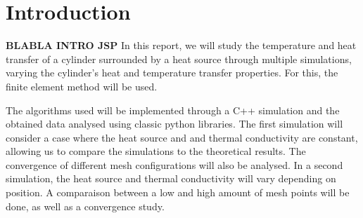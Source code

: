 \section{Introduction}

\textbf{BLABLA INTRO JSP}
In this report, we will study the temperature and heat transfer of a cylinder surrounded by a heat source through multiple simulations, varying the cylinder's heat and temperature transfer properties. For this, the finite element method will be used.

The algorithms used will be implemented through a C++ simulation and the obtained data analysed using classic python libraries. The first simulation will consider a case where the heat source and and thermal conductivity are constant, allowing us to compare the simulations to the theoretical results. The convergence of different mesh configurations will also be analysed. In a second simulation, the heat source and thermal conductivity will vary depending on position. A comparaison between a low and high amount of mesh points will be done, as well as a convergence study.